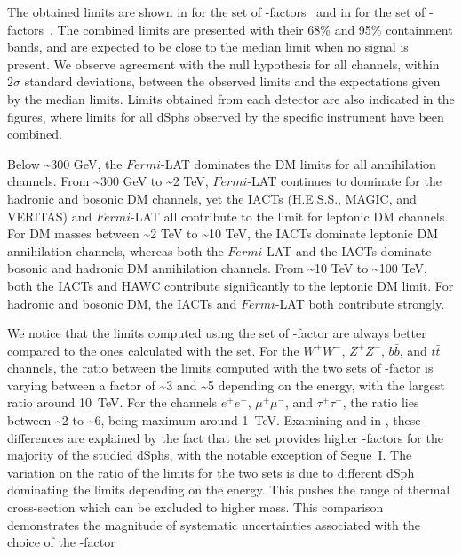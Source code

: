 The obtained limits are shown in  for the \GS set of \J-factors~\cite{Geringer-Sameth:2014yza} and in  for the \B set of \J-factors~\cite{Bonnivard:2014kza, Bonnivard:2015xpq}.
The combined limits are presented with their 68\% and 95\% containment bands, and are expected to be close to the median limit when no signal is present.
We observe agreement with the null hypothesis for all channels, within $2\sigma$ standard deviations, between the observed limits and the expectations given by the median limits.
Limits obtained from each detector are also indicated in the figures, where limits for all dSphs observed by the specific instrument have been combined.

Below \textasciitilde300 GeV, the $Fermi$-LAT dominates the DM limits for all annihilation channels.
From \textasciitilde300 GeV to \textasciitilde2 TeV, $Fermi$-LAT continues to dominate for the hadronic and bosonic DM channels, yet the IACTs (H.E.S.S., MAGIC, and VERITAS) and $Fermi$-LAT all contribute to the limit for leptonic DM channels.
For DM masses between \textasciitilde2 TeV to \textasciitilde10 TeV, the IACTs dominate leptonic DM annihilation channels, whereas both the $Fermi$-LAT and the IACTs dominate bosonic and hadronic DM annihilation channels.
From \textasciitilde10 TeV to \textasciitilde100 TeV, both the IACTs and HAWC contribute significantly to the leptonic DM limit.
For hadronic and bosonic DM, the IACTs and $Fermi$-LAT both contribute strongly.

We notice that the limits computed using the \B set of \J-factor are always better compared to the ones calculated with the \GS set.
For the $W^+W^-$, $Z^+Z^-$, $b\bar{b}$, and $t\bar{t}$ channels, the ratio between the limits computed with the two sets of \J-factor is varying between a factor of \textasciitilde3 and \textasciitilde5 depending on the energy, with the largest ratio around 10~TeV.
For the channels $e^+e^-$, $\mu^+\mu^-$, and $\tau^+\tau^-$, the ratio lies between \textasciitilde2 to \textasciitilde6, being maximum around 1~TeV.
Examining  and  in , these differences are explained by the fact that the \B set provides higher \J-factors for the majority of the studied dSphs, with the notable exception of Segue~I.
The variation on the ratio of the limits for the two sets is due to different dSph dominating the limits depending on the energy.
This pushes the range of thermal cross-section which can be excluded to higher mass.
This comparison demonstrates the magnitude of systematic uncertainties associated with the choice of the \J-factor

